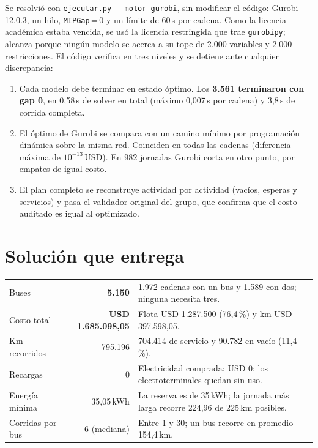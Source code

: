 \documentclass[fontsize=10.5pt,a4paper]{scrartcl}
\newcommand{\hd}[1]{\leavevmode{\sffamily\bfseries\color{ink}#1}}
\newcommand{\arch}[1]{\texttt{#1}}
\begin{document}
Se resolvió con \arch{ejecutar.py -{}-motor gurobi}, sin modificar el código: Gurobi 12.0.3, un hilo, \texttt{MIPGap}\,=\,0 y un límite de 60\,s por cadena. Como la licencia académica estaba vencida, se usó la licencia restringida que trae \arch{gurobipy}; alcanza porque ningún modelo se acerca a su tope de 2.000 variables y 2.000 restricciones. El código verifica en tres niveles y se detiene ante cualquier discrepancia:
\begin{enumerate}
  \item Cada modelo debe terminar en estado óptimo. Los \textbf{3.561 terminaron con gap 0}, en 0,58\,s de solver en total (máximo 0,007\,s por cadena) y 3,8\,s de corrida completa.
  \item El óptimo de Gurobi se compara con un camino mínimo por programación dinámica sobre la misma red. Coinciden en todas las cadenas (diferencia máxima de $10^{-13}$\,USD). En 982 jornadas Gurobi corta en otro punto, por empates de igual costo.
  \item El plan completo se reconstruye actividad por actividad (vacíos, esperas y servicios) y pasa el validador original del grupo, que confirma que el costo auditado es igual al optimizado.
\end{enumerate}

\section{Solución que entrega}

\begin{center}
\small
\begin{tabularx}{\textwidth}{@{}l r X@{}}
\toprule
\hd{Indicador} & \hd{Valor} & \hd{Lectura} \\
\midrule
Buses & \textbf{5.150} & 1.972 cadenas con un bus y 1.589 con dos; ninguna necesita tres. \\
\rowcolor{softrow} Costo total & \textbf{USD 1.685.098,05} & Flota USD 1.287.500 (76,4\,\%) y km USD 397.598,05. \\
Km recorridos & 795.196 & 704.414 de servicio y 90.782 en vacío (11,4\,\%). \\
\rowcolor{softrow} Recargas & 0 & Electricidad comprada: USD 0; los electroterminales quedan sin uso. \\
Energía mínima & 35,05\,kWh & La reserva es de 35\,kWh; la jornada más larga recorre 224,96 de 225\,km posibles. \\
\rowcolor{softrow} Corridas por bus & 6 (mediana) & Entre 1 y 30; un bus recorre en promedio 154,4\,km. \\
\bottomrule
\end{tabularx}
\end{center}
\end{document}
